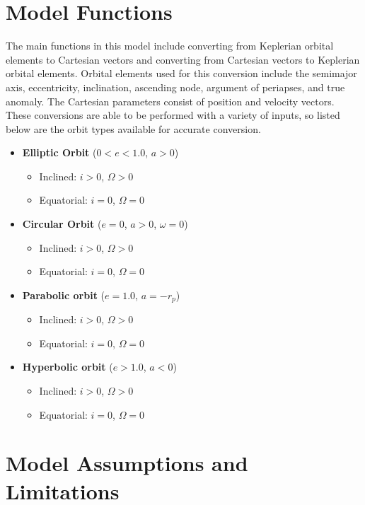 \section{Model Functions}
The main functions in this model include converting from Keplerian orbital elements to Cartesian vectors and converting from Cartesian vectors to Keplerian orbital elements. Orbital elements used for this conversion include the semimajor axis, eccentricity, inclination, ascending node, argument of periapses, and true anomaly. The Cartesian parameters consist of position and velocity vectors. These conversions are able to be performed with a variety of inputs, so listed below are the orbit types available for accurate conversion.

\begin{itemize}
	\item \textbf{Elliptic Orbit} \boldmath($0<e<1.0$, \quad $a>0$)\unboldmath
	\begin{itemize}
		\item Inclined: $i>0$, \quad $\Omega>0$
		\item Equatorial: $i=0$, \quad $\Omega=0$
	\end{itemize}
	\item \textbf{Circular Orbit} \boldmath($e=0$, \quad $a>0$, \quad $\omega=0$)\unboldmath
	\begin{itemize}
		\item Inclined: $i>0$, \quad $\Omega>0$
		\item Equatorial: $i=0$, \quad $\Omega=0$
	\end{itemize}
	\item \textbf{Parabolic orbit} \boldmath($e= 1.0$, \quad $a=-r_p$)\unboldmath
	\begin{itemize}
		\item Inclined: $i>0$, \quad $\Omega>0$
		\item Equatorial: $i=0$, \quad $\Omega=0$
	\end{itemize}
	\item \textbf{Hyperbolic orbit} \boldmath($e>1.0$, \quad $a<0$)\unboldmath
	\begin{itemize}
		\item Inclined: $i>0$, \quad $\Omega>0$
		\item Equatorial: $i=0$, \quad $\Omega=0$
	\end{itemize}
\end{itemize}

\section{Model Assumptions and Limitations}
